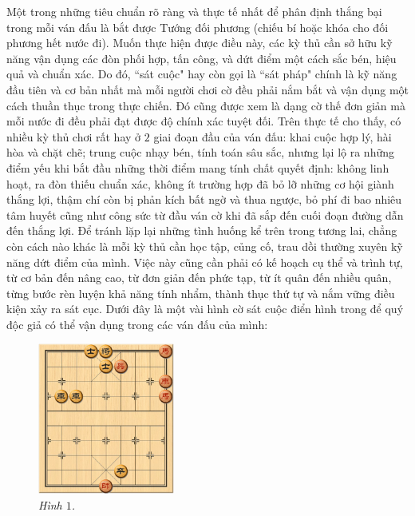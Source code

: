 \vspace*{190pt}
\begin{multicols}{2}
	Một trong những tiêu chuẩn rõ ràng và thực tế nhất để phân định thắng bại trong mỗi ván đấu là bắt được Tướng đối phương (chiếu bí hoặc khóa cho đối phương hết nước đi). Muốn thực hiện được điều này, các kỳ thủ cần sở hữu kỹ năng vận dụng các đòn phối hợp, tấn công, và dứt điểm một cách sắc bén, hiệu quả và chuẩn xác. Do đó, ``sát cuộc" hay còn gọi là ``sát pháp" chính là kỹ năng đầu tiên và cơ bản nhất mà mỗi người chơi cờ đều phải nắm bắt và vận dụng một cách thuần thục trong thực chiến. Đó cũng được xem là dạng cờ thế đơn giản mà mỗi nước đi đều phải đạt được độ chính xác tuyệt đối. 
	\vskip 0.1cm
	Trên thực tế cho thấy, có nhiều kỳ thủ chơi rất hay ở $2$ giai đoạn đầu của ván đấu: khai cuộc hợp lý, hài hòa và chặt chẽ; trung cuộc nhạy bén, tính toán sâu sắc, nhưng lại lộ ra những điểm yếu khi bắt đầu những thời điểm mang tính chất quyết định: không linh hoạt, ra đòn thiếu chuẩn xác, không ít trường hợp đã bỏ lỡ những cơ hội giành thắng lợi, thậm chí còn bị phản kích bất ngờ và thua ngược, bỏ phí đi bao nhiêu tâm huyết cũng như công sức từ đầu ván cờ 
	khi đã sắp đến cuối đoạn đường dẫn đến thắng lợi. 
	\vskip 0.1cm
	Để tránh lặp lại những tình huống kể trên trong tương lai, chẳng còn cách nào khác là mỗi kỳ thủ cần học tập, củng cố, trau dồi thường xuyên kỹ năng dứt điểm của mình. Việc này cũng cần phải có kế hoạch cụ thể và trình tự, từ cơ bản đến nâng cao, từ đơn giản đến phức tạp, từ ít quân đến nhiều quân, từng bước rèn luyện khả năng tính nhẩm, thành thục thứ tự và nắm vững điều kiện xảy ra sát cục.
	\vskip 0.1cm
	Dưới đây là một vài hình cờ sát cuộc  điển hình trong  để quý độc giả có thể vận dụng trong các ván đấu của mình:
	\begin{figure}[H]
		\vspace*{-5pt}
		\centering
		\captionsetup{labelformat= empty, justification=centering}
		\includegraphics[width= 0.4\textwidth]{1}
		\caption{\small\textit{\color{gocco}Hình $1$.}}

\end{figure}
\end{multicols}
